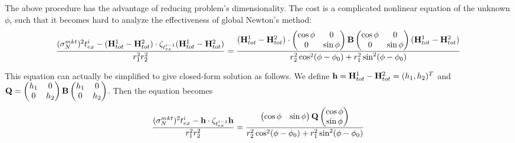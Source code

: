 \documentclass[10pt]{article}
\theoremstyle{plain}
\numberwithin{equation}{section}
\numberwithin{table}{section}
\begin{document}
The above procedure has the advantage of reducing problem's
dimensionality. The cost is a complicated nonlinear equation of the
unknown $\phi$, such that it becomes hard to analyze the effectiveness
of global Newton's method:
\[
\frac{(\sigma_N^{mkt})^2 t_{ex}^i - ({\bf H}_{tot}^{1} - {\bf
H}_{tot}^{2}) \cdot \zeta_{t_{ex}^{i-1}}({\bf H}_{tot}^{1} - {\bf
H}_{tot}^{2})}{r_1^2 r_2^2} = \frac{({\bf H}_{tot}^{1} - {\bf
H}_{tot}^{2}) \cdot \left(\begin{matrix} \cos\phi & 0 \\ 0 & \sin\phi
\end{matrix} \right) {\bf B} \left(\begin{matrix} \cos\phi & 0 \\ 0 &
\sin\phi \end{matrix} \right)({\bf H}_{tot}^{1} - {\bf
H}_{tot}^{2})}{r_2^2\cos^2(\phi-\phi_0)+r_1^2\sin^2(\phi-\phi_0)}
\]


This equation can actually be simplified to give closed-form solution
as follows. We define ${\bf h} = {\bf H}_{tot}^{1} - {\bf H}_{tot}^{2}
= (h_1, h_2)^T$ and ${\bf Q} = \left(\begin{matrix} h_1 & 0 \\ 0 & h_2
\end{matrix}\right) {\bf B} \left(\begin{matrix} h_1 & 0 \\ 0 & h_2
\end{matrix}\right)$. Then the equation becomes
\begin{eqnarray}\label{eqn_phi}
\frac{(\sigma_N^{mkt})^2 t_{ex}^i - {\bf h} \cdot
\zeta_{t_{ex}^{i-1}}{\bf h} }{r_1^2 r_2^2} =
\frac{\left(\begin{matrix} \cos\phi & \sin\phi \end{matrix}\right){\bf
Q} \left(\begin{matrix} \cos\phi \\ \sin\phi
\end{matrix}\right)}{r_2^2\cos^2(\phi-\phi_0)+r_1^2\sin^2(\phi-\phi_0)}
\end{eqnarray}
\end{document}
